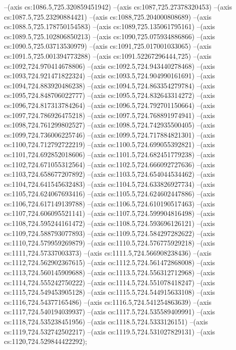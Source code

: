 --(axis cs:1086.5,725.320859451942)
--(axis cs:1087,725.27378320453)
--(axis cs:1087.5,725.23290884421)
--(axis cs:1088,725.204000808689)
--(axis cs:1088.5,725.178750154583)
--(axis cs:1089,725.135061795161)
--(axis cs:1089.5,725.102806850213)
--(axis cs:1090,725.075934886866)
--(axis cs:1090.5,725.03713530979)
--(axis cs:1091,725.017001033065)
--(axis cs:1091.5,725.001394773288)
--(axis cs:1091.52267296444,725)
--(axis cs:1092,724.970414678806)
--(axis cs:1092.5,724.943440278468)
--(axis cs:1093,724.921471822324)
--(axis cs:1093.5,724.904990161691)
--(axis cs:1094,724.883920486238)
--(axis cs:1094.5,724.863354279784)
--(axis cs:1095,724.848706022777)
--(axis cs:1095.5,724.832643314272)
--(axis cs:1096,724.817313784264)
--(axis cs:1096.5,724.792701150664)
--(axis cs:1097,724.786926475218)
--(axis cs:1097.5,724.768891974941)
--(axis cs:1098,724.761299802527)
--(axis cs:1098.5,724.742935500405)
--(axis cs:1099,724.736006225746)
--(axis cs:1099.5,724.717884821301)
--(axis cs:1100,724.712792722219)
--(axis cs:1100.5,724.699055392821)
--(axis cs:1101,724.692852018606)
--(axis cs:1101.5,724.682451779238)
--(axis cs:1102,724.671055312564)
--(axis cs:1102.5,724.666092727636)
--(axis cs:1103,724.658677207892)
--(axis cs:1103.5,724.654044534462)
--(axis cs:1104,724.641545632483)
--(axis cs:1104.5,724.633826927734)
--(axis cs:1105,724.624067693416)
--(axis cs:1105.5,724.624602447886)
--(axis cs:1106,724.617149139788)
--(axis cs:1106.5,724.610190517463)
--(axis cs:1107,724.606095521141)
--(axis cs:1107.5,724.599904816498)
--(axis cs:1108,724.595244161472)
--(axis cs:1108.5,724.593696126121)
--(axis cs:1109,724.588793077893)
--(axis cs:1109.5,724.584297282622)
--(axis cs:1110,724.579959269879)
--(axis cs:1110.5,724.576775929218)
--(axis cs:1111,724.57337003373)
--(axis cs:1111.5,724.566908238436)
--(axis cs:1112,724.562902367615)
--(axis cs:1112.5,724.561472868008)
--(axis cs:1113,724.560145909688)
--(axis cs:1113.5,724.556312712968)
--(axis cs:1114,724.555242750222)
--(axis cs:1114.5,724.551078418247)
--(axis cs:1115,724.549453905128)
--(axis cs:1115.5,724.544915633108)
--(axis cs:1116,724.54377165486)
--(axis cs:1116.5,724.541254863639)
--(axis cs:1117,724.540194039937)
--(axis cs:1117.5,724.535589409991)
--(axis cs:1118,724.535238451956)
--(axis cs:1118.5,724.5333126151)
--(axis cs:1119,724.532742502217)
--(axis cs:1119.5,724.531027829131)
--(axis cs:1120,724.529844422292);

